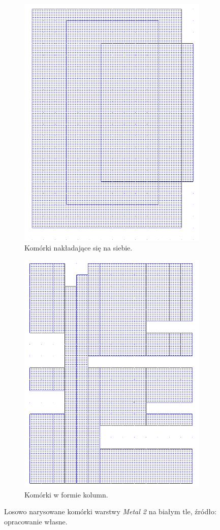 \begin{figure}[h]
    \begin{subfigure}{.5\textwidth}
        \centering
        \includegraphics[width=.4\linewidth]{chapters/chapter2/img/microwind_nadpisanie}
        \caption{Komórki nakładające się na siebie.}
        \label{fig:microwind_nadpisanie}
    \end{subfigure}
    \begin{subfigure}{.5\textwidth}
        \centering
        \includegraphics[width=.4\linewidth]{chapters/chapter2/img/microwind_kolumny}
        \caption{Komórki w formie kolumn.}
        \label{fig:microwind_kolumny}
    \end{subfigure}
    \caption[Losowo narysowane komórki warstwy \textit{Metal 2} na białym tle.]
    {
        Losowo narysowane komórki warstwy \textit{Metal 2} na białym tle,
        źródło: opracowanie własne.
    }
    \label{fig:microwind_biale}
\end{figure}

